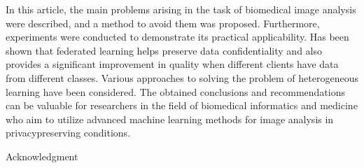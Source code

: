 \documentclass[twocolumn, 10pt]{article}
\begin{document}
In this article, the main problems arising in the task of
biomedical image analysis were described, and a method
to avoid them was proposed. Furthermore, experiments
were conducted to demonstrate its practical applicability.
Has been shown that federated learning helps preserve
data confidentiality and also provides a significant improvement in quality when different clients have data
from different classes. Various approaches to solving the
problem of heterogeneous learning have been considered.
The obtained conclusions and recommendations can be
valuable for researchers in the field of biomedical informatics and medicine who aim to utilize advanced
machine learning methods for image analysis in privacypreserving conditions.
\begin{center}
    Acknowledgment
\end{center}
\end{document}
